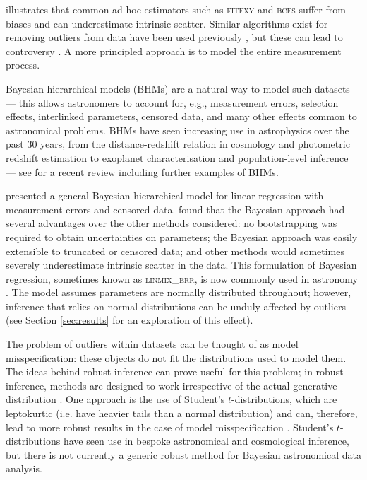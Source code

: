 \documentclass[fleqn,usenatbib]{mnras}
\begin{document}
\citet{Kelly:2007} illustrates that common ad-hoc
estimators such as \textsc{fitexy} \citep{Press:1992, Tremaine:2002} and
\textsc{bces} \citep{Akritas:1996} suffer from biases and can underestimate
intrinsic scatter.
Similar algorithms exist for removing
outliers from data \citep[e.g.][Sigma clipping]{xxxx} have been used previously
\citep[e.g.][]{Riess:xxxx}, but these can
lead to controversy \citep[e.g.][]{Efstathiou:2013}. A more principled approach
is to model the entire measurement process.

Bayesian hierarchical models (BHMs) are a natural way to model such datasets ---
this allows astronomers to account for, e.g., measurement errors, selection
effects, interlinked parameters, censored data, and many other effects common to
astronomical problems. BHMs have seen increasing use in astrophysics over the
past 30 years, from the distance-redshift relation in cosmology
\citep[e.g.][]{Feeney:2018, Avelino:2019} and photometric redshift estimation
\citep[e.g.][]{Leistedt:2016} to exoplanet characterisation
\citep[e.g.][]{Sestovic:2018} and population-level inference
\citep[e.g.][]{Kelly:2009} --- see \citet{Feigelson:2021} for a recent review
including further examples of BHMs.

\citet{Kelly:2007} presented a general Bayesian hierarchical
model for linear regression with measurement errors and censored data.
\citeauthor{Kelly:2007} found that the Bayesian approach had several advantages
over the other methods considered: no bootstrapping was required to obtain
uncertainties on parameters; the Bayesian approach was easily extensible to
truncated or censored data; and other methods would sometimes severely
underestimate intrinsic scatter in the data. This formulation of Bayesian
regression, sometimes known as \textsc{linmix\_err}, is now commonly used in
astronomy \citep[e.g.][]{McConnell:2013, Bentz:2013, Andrews:2013}.
The model assumes parameters are normally distributed throughout; however,
inference that relies on normal distributions can be unduly affected by outliers
(see Section \ref{sec:results} for an exploration of this effect).

The problem of outliers within datasets can be thought of as model
misspecification: these objects do not fit the distributions used to model them.
The ideas behind robust inference can prove useful for this problem; in robust
inference, methods are designed to work irrespective of the actual generative
distribution {\color{red} \citep{Berger:1994}}. One approach is the use of
Student's $t$-distributions, which are leptokurtic (i.e. have heavier tails than
a normal distribution) and can, therefore, lead to more robust results in the
case of model misspecification \citep[e.g.][]{Berger:1994, Gelman:2013}.
Student's $t$-distributions have seen use in bespoke astronomical
\citep[e.g.][]{Park:2017} and cosmological \citep[e.g.][]{Feeney:2018}
inference, but there is not currently a generic robust method for Bayesian
astronomical data analysis.
\end{document}
